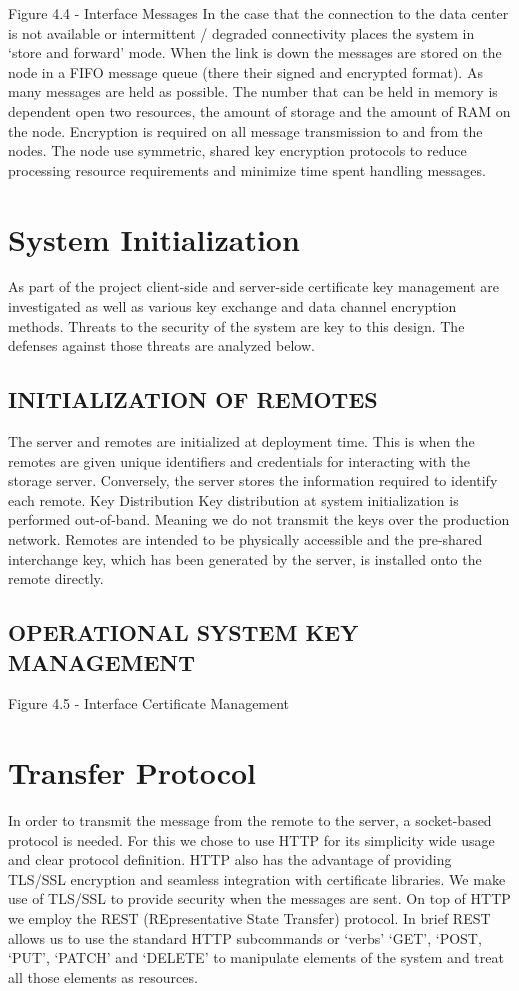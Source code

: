     Figure 4.4 - Interface Messages
    In the case that the connection to the data center is not available or intermittent / degraded connectivity places the system in ‘store and forward’ mode. 
    When the link is down the messages are stored on the node in a FIFO message queue (there their signed and encrypted format). As many messages are held as possible. The number that can be held in memory is dependent open two resources, the amount of storage and the amount of RAM on the node.
    Encryption is required on all message transmission to and from the nodes. The node use symmetric, shared key encryption protocols to reduce processing resource requirements and minimize time spent handling messages. 

\section{System Initialization}
    As part of the project client-side and server-side certificate key management are investigated as well as various key exchange and data channel encryption methods. Threats to the security of the system are key to this design. The defenses against those threats are analyzed below.
\subsection{INITIALIZATION OF REMOTES}
    The server and remotes are initialized at deployment time. This is when the remotes are given unique identifiers and credentials for interacting with the storage server. Conversely, the server stores the information required to identify each remote.  
    Key Distribution
    Key distribution at system initialization is performed out-of-band. Meaning we do not transmit the keys over the production network. Remotes are intended to be physically accessible and the pre-shared interchange key, which has been generated by the server, is installed onto the remote directly.
\subsection{OPERATIONAL SYSTEM KEY MANAGEMENT}
     
     Figure 4.5 - Interface Certificate Management

\section{Transfer Protocol}
     In order to transmit the message from the remote to the server, a socket-based protocol is needed. For this we chose to use HTTP for its simplicity wide usage and clear protocol definition. \cite{Moore:we, Fielding:eSmSU8EF} 
     HTTP also has the advantage of providing TLS/SSL encryption and seamless integration with certificate libraries. We make use of TLS/SSL to provide security when the messages are sent. 
     On top of HTTP we employ the REST (REpresentative State Transfer) protocol. \cite{Fielding:2000dd}  In brief REST allows us to use the standard HTTP subcommands or ‘verbs’ ‘GET’, ‘POST, ‘PUT’, ‘PATCH’ and ‘DELETE’ to manipulate elements of the system and treat all those elements as resources. 
